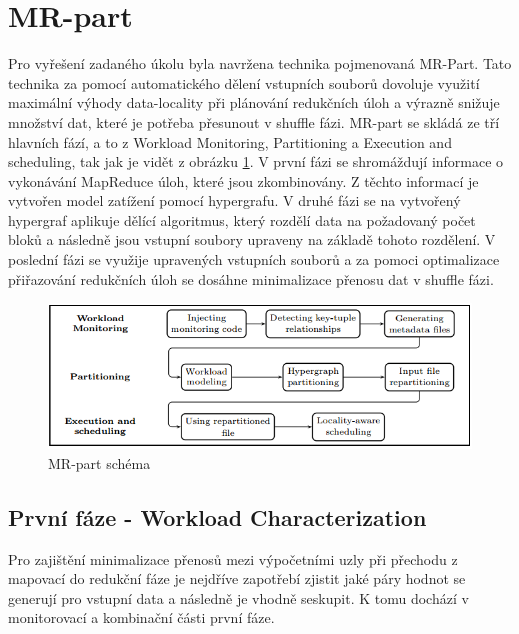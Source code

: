 \documentclass[thesis=M,czech]{FITthesis}[2012/06/26]
\begin{document}
\section{MR-part}
Pro vyřešení zadaného úkolu byla navržena technika pojmenovaná MR-Part. Tato technika za pomocí automatického dělení vstupních souborů dovoluje využití maximální výhody data-locality při plánování redukčních úloh a výrazně snižuje množství dat, které je potřeba přesunout v shuffle fázi. MR-part se skládá ze tří hlavních fází, a to z Workload Monitoring, Partitioning a Execution and scheduling, tak jak je vidět z obrázku \ref{fig:MR-part}. V první fázi se shromáždují informace o vykonávání MapReduce úloh, které jsou zkombinovány. Z těchto informací je vytvořen model zatížení pomocí hypergrafu. V druhé fázi se na vytvořený hypergraf aplikuje dělící algoritmus, který rozdělí data na požadovaný počet bloků a následně jsou vstupní soubory upraveny na základě tohoto rozdělení. V poslední fázi se využije upravených vstupních souborů a za pomoci optimalizace přiřazování redukčních úloh se dosáhne minimalizace přenosu dat v shuffle fázi.

\begin{figure}\centering
	\includegraphics[width=1\textwidth, angle=0]{files/MR-part}
	\caption[MR-part schéma]{MR-part schéma}\label{fig:MR-part}
\end{figure}

\subsection{První fáze - Workload Characterization}
Pro zajištění minimalizace přenosů mezi výpočetními uzly při přechodu z mapovací do redukční fáze je nejdříve zapotřebí zjistit jaké páry hodnot se generují pro vstupní data a následně je vhodně seskupit. K tomu dochází v monitorovací a kombinační části první fáze.
\end{document}
